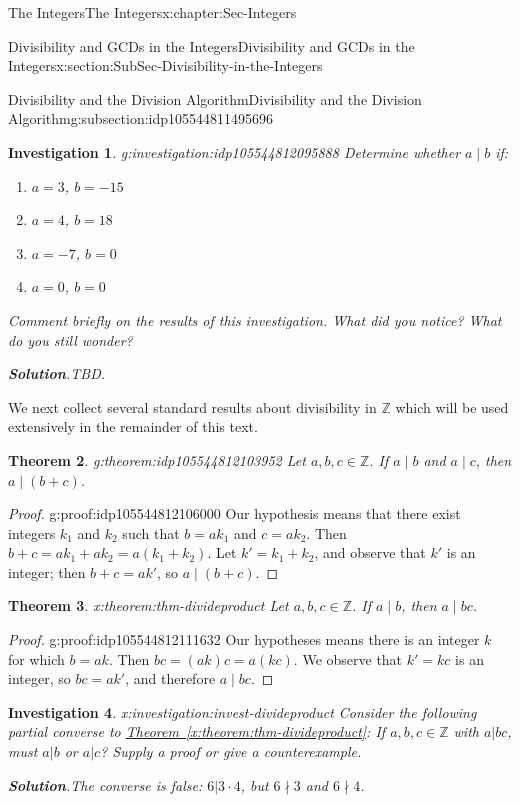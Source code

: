 \documentclass[oneside,10pt,]{book}
\newcommand{\blocktitlefont}{\relax}
\newcommand{\xreffont}{\relax}
\numberwithin{equation}{section}
\def\Z{{\mathbb Z}}
\newtheorem{theorem}{Theorem}[section]
\newtheorem{investigation}[theorem]{Investigation}
\begin{document}
\begin{chapterptx}{The Integers}{}{The Integers}{}{}{x:chapter:Sec-Integers}
\begin{sectionptx}{Divisibility and GCDs in the Integers}{}{Divisibility and GCDs in the Integers}{}{}{x:section:SubSec-Divisibility-in-the-Integers}
\begin{subsectionptx}{Divisibility and the Division Algorithm}{}{Divisibility and the Division Algorithm}{}{}{g:subsection:idp105544811495696}
\begin{investigation}{}{g:investigation:idp105544812095888}%
Determine whether \(a\mid b\) if:%
\begin{enumerate}
\item{}\(a = 3\), \(b = -15\)%
\item{}\(a = 4\), \(b = 18\)%
\item{}\(a = -7\), \(b = 0\)%
\item{}\(a = 0\), \(b = 0\)%
\end{enumerate}
Comment briefly on the results of this investigation. What did you notice? What do you still wonder?%
\par\smallskip%
\noindent\textbf{\blocktitlefont Solution}.\hypertarget{g:solution:idp105544812102928}{}\quad{}TBD.%
\end{investigation}%
We next collect several standard results about divisibility in \(\Z\) which will be used extensively in the remainder of this text.%
\begin{theorem}{}{}{g:theorem:idp105544812103952}%
Let \(a,b,c\in\Z\). If \(a\mid b\) and \(a\mid c\), then \(a\mid (b+c)\).%
\end{theorem}
\begin{proof}{}{g:proof:idp105544812106000}
Our hypothesis means that there exist integers \(k_1\) and \(k_2\) such that \(b = a k_1\) and \(c = a k_2\). Then \(b+c = a k_1 + a k_2 = a(k_1 + k_2)\). Let \(k' = k_1 + k_2\), and observe that \(k'\) is an integer; then \(b+c = a k'\), so \(a\mid (b+c)\).%
\end{proof}
\begin{theorem}{}{}{x:theorem:thm-divideproduct}%
Let \(a,b,c\in\Z\). If \(a\mid b\), then \(a\mid bc\).%
\end{theorem}
\begin{proof}{}{g:proof:idp105544812111632}
Our hypotheses means there is an integer \(k\) for which \(b = ak\). Then \(bc = (ak)c = a(kc)\). We observe that \(k' = kc\) is an integer, so \(bc = ak'\), and therefore \(a\mid bc\).%
\end{proof}
\begin{investigation}{}{x:investigation:invest-divideproduct}%
Consider the following partial converse to \hyperref[x:theorem:thm-divideproduct]{Theorem~{\xreffont\ref{x:theorem:thm-divideproduct}}}: If \(a,b,c\in\Z\) with \(a|bc\), must \(a|b\) or \(a|c\)? Supply a proof or give a counterexample.%
\par\smallskip%
\noindent\textbf{\blocktitlefont Solution}.\hypertarget{g:solution:idp105544812117136}{}\quad{}The converse is false: \(6| 3\cdot 4\), but \(6\nmid 3\) and \(6\nmid 4\).%

\end{investigation}
\end{subsectionptx}
\end{sectionptx}
\end{chapterptx}
\end{document}
